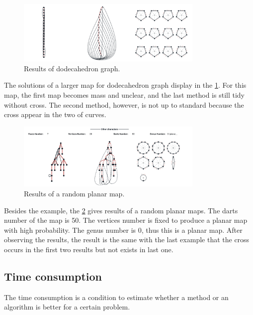   \begin{figure}[htb]
    \centering
    \includegraphics[width=0.8\textwidth]{../../image/cross2.png}
    \caption{Results of dodecahedron graph.}
    \label{fig:figures:cross2}
  \end{figure}
  The solutions of a larger map for dodecahedron graph display in the \cref{fig:figures:cross2}. For this map, the first map becomes mass and unclear, and the last method is still tidy without cross. The second method, however, is not up to standard because the cross appear in the two of curves.
  \begin{figure}[htb]
    \centering
    \includegraphics[width=0.8\textwidth]{../../image/randomplanar.png}
    \caption{Results of a random planar map.}
    \label{fig:figures:randomplanar}
  \end{figure}
  \newpage
  Besides the example, the \cref{fig:figures:randomplanar} gives results of a random planar maps. The darts number of the map is 50. The vertices number is fixed to produce a planar map with high probability. The genus number is 0, thus this is a planar map. After observing the results, the result is the same with the last example that the cross occurs in the first two results but not exists in last one.

  \subsection{Time consumption}
  The time consumption is a condition to estimate whether a method or an algorithm is better for a certain problem. 

